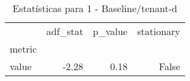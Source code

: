 \begin{table}[htbp]
\caption{Estatísticas para 1 - Baseline/tenant-d}
\label{tab:1_-_baseline_tenant-d_adf_test}
\begin{tabular}{lrrr}
\toprule
 & adf_stat & p_value & stationary \\
metric &  &  &  \\
\midrule
value & -2.28 & 0.18 & False \\
\bottomrule
\end{tabular}
\end{table}

